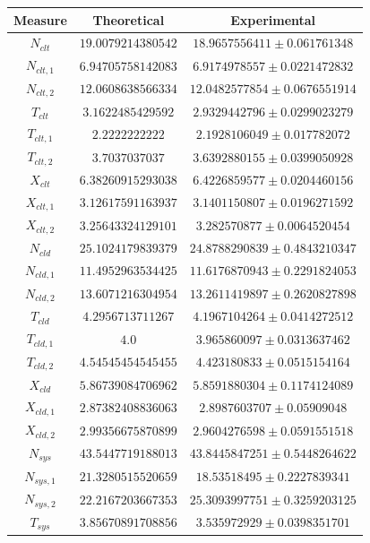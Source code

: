 \begin{figure}
	\begin{center}
		\begin{tabular}{|c||c|c|}
\hline
Measure & Theoretical & Experimental \\
\hline
$N_{clt}$  & $19.0079214380542$ & $18.9657556411\pm 0.061761348$ \\ 
$N_{clt,1}$  & $6.94705758142083$ & $6.9174978557\pm 0.0221472832$ \\ 
$N_{clt,2}$  & $12.0608638566334$ & $12.0482577854\pm 0.0676551914$ \\ 
$T_{clt}$  & $3.1622485429592$ & $2.9329442796\pm 0.0299023279$ \\ 
$T_{clt,1}$  & $2.2222222222$ & $2.1928106049\pm 0.017782072$ \\ 
$T_{clt,2}$  & $3.7037037037$ & $3.6392880155\pm 0.0399050928$ \\ 
$X_{clt}$  & $6.38260915293038$ & $6.4226859577\pm 0.0204460156$ \\ 
$X_{clt,1}$  & $3.12617591163937$ & $3.1401150807\pm 0.0196271592$ \\ 
$X_{clt,2}$  & $3.25643324129101$ & $3.282570877\pm 0.0064520454$ \\ 
\hline 
$N_{cld}$  & $25.1024179839379$ & $24.8788290839\pm 0.4843210347$ \\ 
$N_{cld,1}$  & $11.4952963534425$ & $11.6176870943\pm 0.2291824053$ \\ 
$N_{cld,2}$  & $13.6071216304954$ & $13.2611419897\pm 0.2620827898$ \\ 
$T_{cld}$  & $4.2956713711267$ & $4.1967104264\pm 0.0414272512$ \\ 
$T_{cld,1}$  & $4.0$ & $3.965860097\pm 0.0313637462$ \\ 
$T_{cld,2}$  & $4.54545454545455$ & $4.423180833\pm 0.0515154164$ \\ 
$X_{cld}$  & $5.86739084706962$ & $5.8591880304\pm 0.1174124089$ \\ 
$X_{cld,1}$  & $2.87382408836063$ & $2.8987603707\pm 0.05909048$ \\ 
$X_{cld,2}$  & $2.99356675870899$ & $2.9604276598\pm 0.0591551518$ \\ 
\hline 
$N_{sys}$  & $43.5447719188013$ & $43.8445847251\pm 0.5448264622$ \\ 
$N_{sys,1}$  & $21.3280515520659$ & $18.53518495\pm 0.2227839341$ \\ 
$N_{sys,2}$  & $22.2167203667353$ & $25.3093997751\pm 0.3259203125$ \\ 
$T_{sys}$  & $3.85670891708856$ & $3.535972929\pm 0.0398351701$ \\ 

\end{tabular}
\end{center}
\end{figure}
